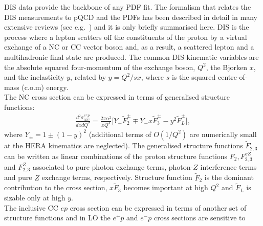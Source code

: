 DIS data provide the backbone of any PDF fit.
The for\-ma\-lism that relates the DIS measurements to pQCD and the PDFs has been described
in detail in many extensive reviews (see e.g.~\cite{disbook}) and it is only briefly summarised here.
DIS is the process where a lepton scatters off the constituents of the proton
by a virtual exchange of a NC 
or CC vector boson and, as a result, a scattered lepton and a 
multihadronic final state are produced.
The common DIS kinematic variables are the absolute squared four-momentum of 
the exchange boson, $Q^2$, the Bjorken $x$, 
and the inelasticity $y$, related by $y=Q^2/sx$, where $s$ is the squared centre-of-mass (c.o.m) energy.
\\
%
The NC cross section can be expressed in terms of generalised structure functions:
\begin{eqnarray}
   \frac{d^2\sigma_{NC}^{e^{\pm} p}}{dxdQ^2}=\frac{2\pi\alpha^2}{xQ^4} 
     \big [ Y_{+} \tilde F_2^{\pm} \mp Y_{-}x \tilde F_3^{\pm} - y^2 \tilde F_L^{\pm} \big ],
\end{eqnarray}
where $Y_{\pm} = 1 \pm (1-y)^2$ (additional terms of $O(1/Q^2)$ are numerically small 
at the HERA kinematics are neglected). 
The generalised structure functions $\tilde F_{2,3}$ 
can be written as linear combinations of the proton structure functions $F_2, F_{2,3}^{\gamma Z}$ 
and $F_{2,3}^Z$ associated to pure photon exchange terms, photon-$Z$ interference
terms and pure $Z$ exchange terms, respectively. 
Structure function $\tilde F_2$ is the dominant contribution to the cross section, 
$x \tilde F_3$ becomes important at high $Q^2$ and $\tilde F_L$ is sizable 
only at high $y$. 
\\
The inclusive CC $ep$ cross section can be expressed 
in terms of another set of structure functions and in LO the $e^+p$ and $e^-p$ cross sections are sensitive to 
